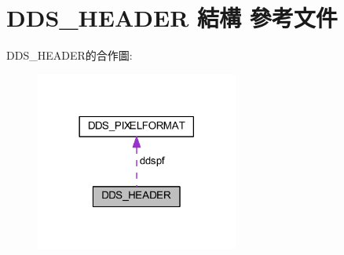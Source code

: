 \hypertarget{struct_d_d_s___h_e_a_d_e_r}{}\section{D\+D\+S\+\_\+\+H\+E\+A\+D\+ER 結構 參考文件}
\label{struct_d_d_s___h_e_a_d_e_r}


D\+D\+S\+\_\+\+H\+E\+A\+D\+E\+R的合作圖\+:\nopagebreak
\begin{figure}[H]
\begin{center}
\leavevmode
\includegraphics[width=189pt]{struct_d_d_s___h_e_a_d_e_r__coll__graph}
\end{center}
\end{figure}
